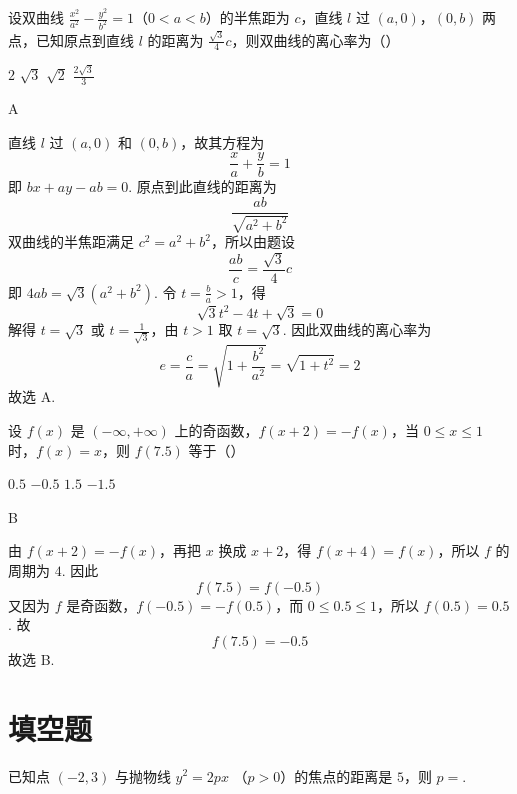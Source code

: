 \begin{problem}
设双曲线 \(\frac{x^2}{a^2} - \frac{y^2}{b^2} = 1\)（\(0 < a < b\)）的半焦距为 \(c\)，直线 \(l\) 过 \(\left(a, 0\right)\)，\(\left(0, b\right)\) 两点，已知原点到直线 \(l\) 的距离为 \(\frac{\sqrt{3}}{4} c\)，则双曲线的离心率为（\quad）

\choices
    {\(2\)}
    {\(\sqrt{3}\)}
    {\(\sqrt{2}\)}
    {\(\frac{2\sqrt{3}}{3}\)}
\end{problem}

\begin{answer}
A
\end{answer}

\begin{solution}
直线 \(l\) 过 \((a,0)\) 和 \((0,b)\)，故其方程为
\[
\frac{x}{a}+\frac{y}{b}=1
\]
即 \(bx+ay-ab=0\). 原点到此直线的距离为
\[
\frac{ab}{\sqrt{a^2+b^2}}
\]
双曲线的半焦距满足 \(c^2=a^2+b^2\)，所以由题设
\[
\frac{ab}{c}=\frac{\sqrt{3}}{4}c
\]
即 \(4ab=\sqrt{3}(a^2+b^2)\). 令 \(t=\frac{b}{a}>1\)，得
\[
\sqrt{3}t^2-4t+\sqrt{3}=0
\]
解得 \(t=\sqrt{3}\) 或 \(t=\frac{1}{\sqrt{3}}\)，由 \(t>1\) 取 \(t=\sqrt{3}\). 因此双曲线的离心率为
\[
e=\frac{c}{a}=\sqrt{1+\frac{b^2}{a^2}}=\sqrt{1+t^2}=2
\]
故选 A.
\end{solution}

\begin{problem}
设 \(f\left(x\right)\) 是 \(\left(-\infty, +\infty\right)\) 上的奇函数，\(f\left(x + 2\right) = -f\left(x\right)\)，当 \(0 \leqslant x \leqslant 1\) 时，\(f\left(x\right) = x\)，则 \(f\left(7.5\right)\) 等于（\quad）

\choices
    {\(0.5\)}
    {\(-0.5\)}
    {\(1.5\)}
    {\(-1.5\)}
\end{problem}

\begin{answer}
B
\end{answer}

\begin{solution}
由 \(f(x+2)=-f(x)\)，再把 \(x\) 换成 \(x+2\)，得 \(f(x+4)=f(x)\)，所以 \(f\) 的周期为 \(4\). 因此
\[
f(7.5)=f(-0.5)
\]
又因为 \(f\) 是奇函数，\(f(-0.5)=-f(0.5)\)，而 \(0\leqslant0.5\leqslant1\)，所以 \(f(0.5)=0.5\). 故
\[
f(7.5)=-0.5
\]
故选 B.
\end{solution}

\section{填空题}

\begin{problem}
已知点 \((-2,3)\) 与抛物线 \(y^{2} = 2px\) （\(p > 0\)）的焦点的距离是 \(5\)，则 \(p =\)\fillinblank{}.
\end{problem}

